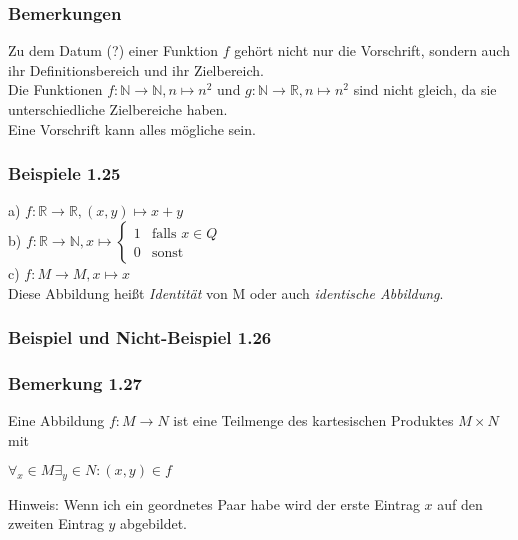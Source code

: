\documentclass{article}
\begin{document}
\subsubsection*{Bemerkungen}
Zu dem Datum (?) einer Funktion $f$ gehört nicht nur die Vorschrift, sondern auch ihr Definitionsbereich und ihr Zielbereich. \\
Die Funktionen $f: \mathbb{N} \rightarrow \mathbb{N}, n \mapsto n^2$ und $g: \mathbb{N} \rightarrow \mathbb{R}, n \mapsto n^2$ sind nicht gleich, da sie unterschiedliche Zielbereiche haben. \\
Eine Vorschrift kann alles mögliche sein.


\subsubsection*{Beispiele 1.25}
a) $f: \mathbb{R} \rightarrow \mathbb{R}, (x, y) \mapsto x + y$ \\
b) $f: \mathbb{R} \rightarrow \mathbb{N}, x \mapsto 
\begin{cases}
    1 & \text{falls } x \in Q \\
    0 & \text{sonst}
\end{cases}
$ \\
c) $f: M \rightarrow M, x \mapsto x$ \\
Diese Abbildung heißt \textit{Identität} von M oder auch \textit{identische Abbildung}. 

\subsubsection*{Beispiel und Nicht-Beispiel 1.26}

\subsubsection*{Bemerkung 1.27}
Eine Abbildung $f: M \rightarrow N$ ist eine Teilmenge des kartesischen Produktes $M \times N$ mit 
\begin{center}
    $\forall_x \in M \exists_y \in N: (x, y) \in f$
\end{center}
Hinweis: Wenn ich ein geordnetes Paar habe wird der erste Eintrag $x$ auf den zweiten Eintrag $y$ abgebildet. 
\\
\\
\end{document}
